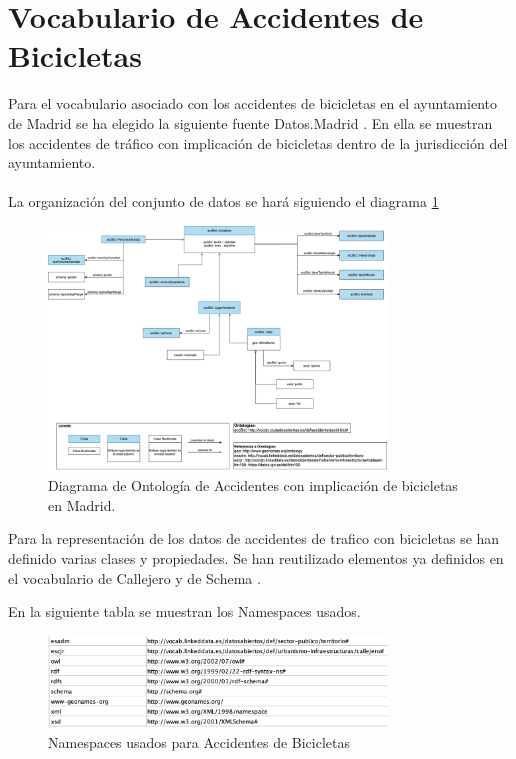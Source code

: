 \section{Vocabulario de Accidentes de Bicicletas}

Para el vocabulario asociado con los accidentes de bicicletas en el ayuntamiento de Madrid se ha elegido la siguiente fuente Datos.Madrid \cite{datosMadrid_accidentesDeBicicleta}.
En ella se muestran los accidentes de tráfico con implicación de bicicletas dentro de la jurisdicción del ayuntamiento.
\\
\\
La organización del conjunto de datos se hará siguiendo el diagrama \ref{fig:diagramaOntologAccid}

\begin{figure}[h]
	\centering
		\includegraphics[angle=0, width=0.8\textwidth]{images/diagramaAccidBici.png}  
	\caption{Diagrama de Ontología de Accidentes con implicación de bicicletas en Madrid.}
	\label{fig:diagramaOntologAccid}
\end{figure}


Para la representación de los datos de accidentes de trafico con bicicletas se han definido varias clases y propiedades. Se han reutilizado elementos ya definidos en el vocabulario de Callejero \cite{ciudadesbiertas_callejero} y de Schema \cite{schema_org}.

\clearpage
En la siguiente tabla se muestran los Namespaces usados.

\begin{figure}[h]
	\centering
		\includegraphics[angle=0, width=0.8\textwidth]{images/tablaIRIsAccidentesBici.png}  
	\caption{Namespaces usados para Accidentes de Bicicletas}
\end{figure}




